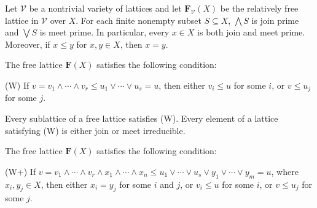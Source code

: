 \begin{corollary}
Let $\mathcal V$ be a nontrivial variety of lattices and let $\mathbf{F}_{\mathcal V}(X)$ be the relatively free lattice in $\mathcal V$ over $X$.  For each finite nonempty subset $S \subseteq X$, $\bigwedge S$ is join prime and $\bigvee S$ is meet prime. In particular, every $x\in X$ is both join and meet prime.  Moreover, if $x\leqslant y$ for $x, y \in X$, then $x = y$.
\end{corollary}

\begin{theorem}  
The free lattice $\mathbf{F}(X)$ satisfies the following condition:

(W)  If $v = v_1 \wedge \cdots \wedge v_r \leqslant u_1 \vee \cdots \vee u_s = u$, 
then either $v_i \leqslant u$ for some $i$, or $v \leqslant u_j$ for some $j$. 
\end{theorem}

\begin{corollary}
Every sublattice of a free lattice satisfies (W). Every element of a lattice satisfying (W) is either join or meet irreducible.
\end{corollary}

\begin{theorem}  
The free lattice $\mathbf{F}(X)$ satisfies the following condition:

(W+)  If $v = v_1 \wedge \cdots \wedge v_r \wedge x_1 \wedge \cdots
\wedge x_n \leqslant u_1 \vee \cdots \vee u_s \vee
y_1 \vee \cdots \vee y_m = u$, where $x_i, y_j\in X$, then either 
$x_i = y_j$ for some $i$ and $j$, or $v_i \leqslant u$ for some $i$, or
$v \leqslant u_j$ for some $j$. 
\end{theorem}

